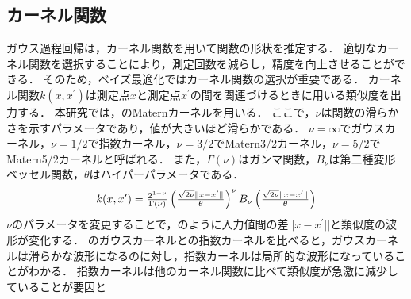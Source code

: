 \documentclass[twocolumn]{ltjarticle}
\begin{document}
\subsection{カーネル関数}

ガウス過程回帰は，カーネル関数を用いて関数の形状を推定する．
適切なカーネル関数を選択することにより，測定回数を減らし，精度を向上させることができる．
そのため，ベイズ最適化ではカーネル関数の選択が重要である\cite{gaussian_process}．
カーネル関数\(k(x, x^{\prime})\)は測定点\(x\)と測定点\(x^{\prime}\)の間を関連づけるときに用いる類似度を出力する．
本研究では，のMaternカーネルを用いる．
ここで，\(\nu\)は関数の滑らかさを示すパラメータであり，値が大きいほど滑らかである．
\(\nu=\infty\)でガウスカーネル，\(\nu=1/2\)で指数カーネル，\(\nu=3/2\)でMatern3/2カーネル，\(\nu=5/2\)でMatern5/2カーネルと呼ばれる．
また，\(\Gamma (\nu)\)はガンマ関数，\(B_{\nu}\)は第二種変形ベッセル関数，\(\theta\)はハイパーパラメータである．
\begin{align}
	\scalebox{1.0}{
		\(
		k(x, x^{\prime}) = \frac{2^{1-\nu}}{\Gamma (\nu)}\left(\frac{\sqrt{2\nu}\Vert x - x^{\prime} \Vert}{\theta}\right)^{\nu} B_{\nu} \left(\frac{\sqrt{2 \nu} \Vert x - x^{\prime} \Vert}{\theta}\right) \label{eq:matern}
		\)
	}
\end{align}
\(\nu\)のパラメータを変更することで，のように入力値間の差\(||x-x^{\prime}||\)と類似度の波形が変化する．
のガウスカーネルとの指数カーネルを比べると，ガウスカーネルは滑らかな波形になるのに対し，指数カーネルは局所的な波形になっていることがわかる．
指数カーネルは他のカーネル関数に比べて類似度が急激に減少していることが要因と
\setlength\intextsep{6pt}
\setlength\textfloatsep{6pt}
\end{document}
